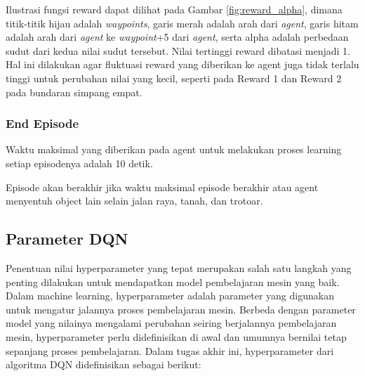 \documentclass[conference]{IEEEtran}
\begin{document}
Ilustrasi fungsi reward dapat dilihat pada Gambar \ref{fig:reward_alpha}, dimana titik-titik hijau adalah \textit{waypoints}, garis merah adalah arah dari \textit{agent}, garis hitam adalah arah dari \textit{agent} ke \textit{waypoint}+5 dari \textit{agent}, serta alpha adalah perbedaan sudut dari kedua nilai sudut tersebut. Nilai tertinggi reward dibatasi menjadi 1. Hal ini dilakukan agar fluktuasi reward yang diberikan ke agent juga tidak terlalu tinggi untuk perubahan nilai yang kecil, seperti pada Reward 1 dan Reward 2 pada bundaran simpang empat.


\subsubsection{End Episode}
\label{sec:end_episode}
Waktu maksimal yang diberikan pada agent untuk melakukan proses learning setiap episodenya adalah 10 detik.

Episode akan berakhir jika waktu maksimal episode berakhir atau agent menyentuh object lain selain jalan raya, tanah, dan trotoar.

\subsection{Parameter DQN}
\label{sec:parameter_dqn}
Penentuan nilai hyperparameter yang tepat merupakan salah satu langkah yang penting dilakukan untuk mendapatkan model pembelajaran mesin yang baik. Dalam machine learning, hyperparameter adalah parameter yang digunakan untuk mengatur jalannya proses pembelajaran mesin. Berbeda dengan parameter model yang nilainya mengalami perubahan seiring berjalannya pembelajaran mesin, hyperparameter perlu didefinisikan di awal dan umumnya bernilai tetap sepanjang proses pembelajaran. Dalam tugas akhir ini, hyperparameter dari algoritma DQN didefinisikan sebagai berikut:
\end{document}
